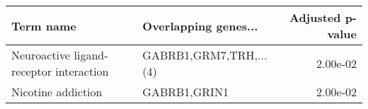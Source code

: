 \begin{tabular}{llr}
\toprule
                              Term name &   Overlapping genes... &  Adjusted p-value \\
\midrule
Neuroactive ligand-receptor interaction & GABRB1,GRM7,TRH,...(4) &          2.00e-02 \\
                     Nicotine addiction &           GABRB1,GRIN1 &          2.00e-02 \\
\bottomrule
\end{tabular}
